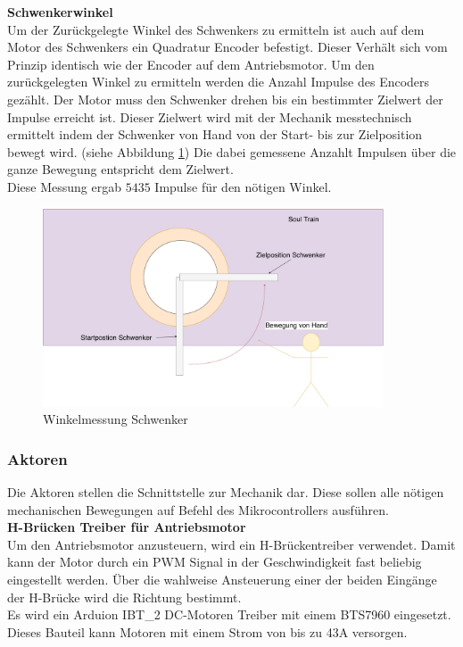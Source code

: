 \documentclass[../../main.tex]{subfiles}
\begin{document}
    \textbf{Schwenkerwinkel}\\
    Um der Zurückgelegte Winkel des Schwenkers zu ermitteln ist auch auf dem Motor des Schwenkers ein Quadratur Encoder befestigt. Dieser Verhält sich vom Prinzip identisch wie der Encoder auf dem Antriebsmotor. Um den zurückgelegten Winkel zu ermitteln werden die Anzahl Impulse des Encoders gezählt. Der Motor muss den Schwenker drehen bis ein bestimmter Zielwert der Impulse erreicht ist. Dieser Zielwert wird mit der Mechanik messtechnisch ermittelt indem der Schwenker von Hand von der Start- bis zur Zielposition bewegt wird. (siehe Abbildung \ref{fig:et_schwenker_messung}) Die dabei gemessene Anzahlt Impulsen über die ganze Bewegung entspricht dem Zielwert.\\
    Diese Messung ergab $5435$ Impulse für den nötigen Winkel.

    \begin{figure}[H]
        \centering
        \includegraphics[width=0.9\textwidth]{../../images/et/et_schwenker_messung.pdf}
        \caption {Winkelmessung Schwenker}
        \label{fig:et_schwenker_messung}
    \end{figure}

    \subsubsection{Aktoren} \label{et_aktoren}
    Die Aktoren stellen die Schnittstelle zur Mechanik dar. Diese sollen alle nötigen mechanischen Bewegungen auf Befehl des Mikrocontrollers ausführen.\\

    \textbf{H-Brücken Treiber für Antriebsmotor}\\
    Um den Antriebsmotor anzusteuern, wird ein H-Brückentreiber verwendet. Damit kann der Motor durch ein PWM Signal in der Geschwindigkeit fast beliebig eingestellt werden. Über die wahlweise Ansteuerung einer der beiden Eingänge der H-Brücke wird die Richtung bestimmt.\\
    Es wird ein Arduion IBT\_2 DC-Motoren Treiber mit einem BTS7960 eingesetzt. Dieses Bauteil kann Motoren mit einem Strom von bis zu 43A versorgen. \\
\end{document}

